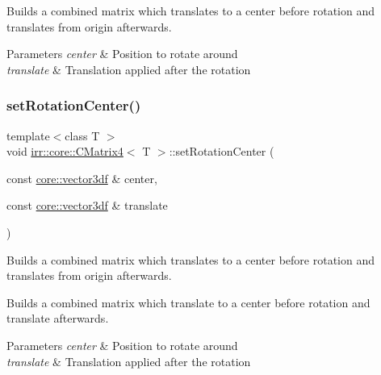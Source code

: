 Builds a combined matrix which translates to a center before rotation and translates from origin afterwards. 


\begin{DoxyParams}{Parameters}
{\em center} & Position to rotate around \\
\hline
{\em translate} & Translation applied after the rotation \\
\hline
\end{DoxyParams}
\mbox{\label{classirr_1_1core_1_1CMatrix4_a8117628146ce654b3b292af7c49e25e2}} 
\subsubsection{\texorpdfstring{set\+Rotation\+Center()}{setRotationCenter()}\hspace{0.1cm}{\footnotesize\ttfamily [2/2]}}
{\footnotesize\ttfamily template$<$class T $>$ \\
void \hyperlink{classirr_1_1core_1_1CMatrix4}{irr\+::core\+::\+C\+Matrix4}$<$ T $>$\+::set\+Rotation\+Center (\begin{DoxyParamCaption}\item[{const \hyperlink{namespaceirr_1_1core_ae6e2b2a6c552833ebbd5b7463d03586b}{core\+::vector3df} \&}]{center,  }\item[{const \hyperlink{namespaceirr_1_1core_ae6e2b2a6c552833ebbd5b7463d03586b}{core\+::vector3df} \&}]{translate }\end{DoxyParamCaption})\hspace{0.3cm}{\ttfamily [inline]}}



Builds a combined matrix which translates to a center before rotation and translates from origin afterwards. 

Builds a combined matrix which translate to a center before rotation and translate afterwards.


\begin{DoxyParams}{Parameters}
{\em center} & Position to rotate around \\
\hline
{\em translate} & Translation applied after the rotation \\
\hline
\end{DoxyParams}
\mbox{\label{classirr_1_1core_1_1CMatrix4_a445a7653292ae4ffb0baa50032a8674e}} 
